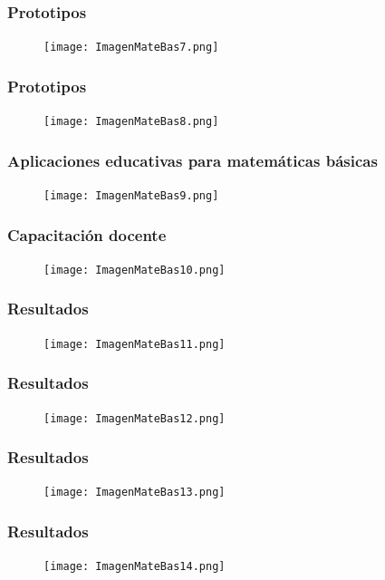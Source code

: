 \documentclass[11pt]{beamer}
\begin{document}
\begin{frame}
\frametitle{Prototipos}
    \begin{figure}
    \centering
     \texttt{[image: ImagenMateBas7.png]}
    \end{figure}
\end{frame}

\begin{frame}
\frametitle{Prototipos}
    \begin{figure}
    \centering
     \texttt{[image: ImagenMateBas8.png]}
    \end{figure}
\end{frame}

\begin{frame}
\frametitle{Aplicaciones educativas para matemáticas básicas}
    \begin{figure}
    \centering
     \texttt{[image: ImagenMateBas9.png]}
    \end{figure}
\end{frame}

\begin{frame}
\frametitle{Capacitación docente}
    \begin{figure}
    \centering
     \texttt{[image: ImagenMateBas10.png]}
    \end{figure}
\end{frame}

\begin{frame}
\frametitle{Resultados}
    \begin{figure}
    \centering
     \texttt{[image: ImagenMateBas11.png]}
    \end{figure}
\end{frame}

\begin{frame}
\frametitle{Resultados}
    \begin{figure}
    \centering
     \texttt{[image: ImagenMateBas12.png]}
    \end{figure}
\end{frame}

\begin{frame}
\frametitle{Resultados}
    \begin{figure}
    \centering
     \texttt{[image: ImagenMateBas13.png]}
    \end{figure}
\end{frame}

\begin{frame}
\frametitle{Resultados}
    \begin{figure}
    \centering
     \texttt{[image: ImagenMateBas14.png]}
    \end{figure}
\end{frame}
\end{document}
